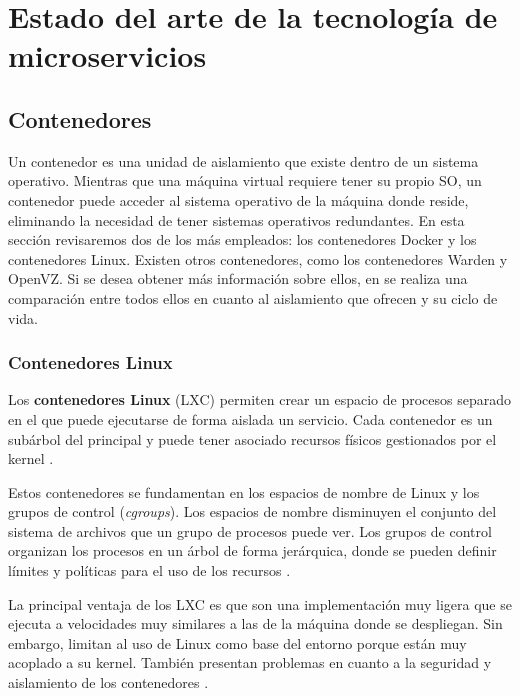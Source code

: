 \documentclass[11pt,spanish,listoffigures]{tfgetsinf}
\begin{document}
%

\chapter{Estado del arte de la tecnología de microservicios}

\section{Contenedores}

Un contenedor \cite{Hunter2017} es una unidad de aislamiento que existe dentro de un sistema operativo. Mientras que una máquina virtual requiere tener su propio SO, un contenedor puede acceder al sistema operativo de la máquina donde reside, eliminando la necesidad de tener sistemas operativos redundantes. En esta sección revisaremos dos de los más empleados: los contenedores Docker y los contenedores Linux. Existen otros contenedores, como los contenedores Warden y OpenVZ. Si se desea obtener más información sobre ellos, en \cite{Dua2014} se realiza una comparación entre todos ellos en cuanto al aislamiento que ofrecen y su ciclo de vida.

\subsection{Contenedores Linux}

Los \textbf{contenedores Linux} (LXC) \cite{Amaral2016} permiten crear un espacio de procesos separado en el que puede ejecutarse de forma aislada un servicio. Cada contenedor es un subárbol del principal y puede tener asociado recursos físicos gestionados por el kernel \cite{Newman2015a}.

Estos contenedores se fundamentan en los espacios de nombre de Linux y los grupos de control (\textit{cgroups}). Los espacios de nombre disminuyen el conjunto del sistema de archivos que un grupo de procesos puede ver. Los grupos de control organizan los procesos en un árbol de forma jerárquica, donde se pueden definir límites y políticas para el uso de los recursos \cite{Amaral2016}.

La principal ventaja de los LXC es que son una implementación muy ligera que se ejecuta a velocidades muy similares a las de la máquina donde se despliegan. Sin embargo, limitan al uso de Linux como base del entorno porque están muy acoplado a su kernel. También presentan problemas en cuanto a la seguridad y aislamiento de los contenedores \cite{Dua2014}. 
\end{document}
